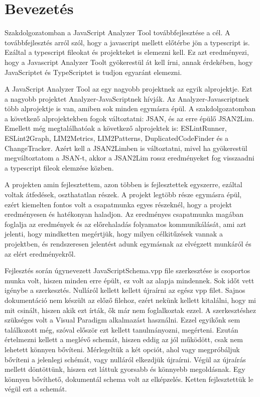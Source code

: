 \chapter*{Bevezetés}

\noindent

Szakdolgozatomban a JavaScript Analyzer Tool továbbfejlesztése a cél.
A továbbfejlesztés arról szól, hogy a javascript mellett előtérbe jön a typescript is.
Ezáltal a typescript fileokat és projekteket is elemezni kell.
Ez azt eredményezi, hogy a Javascript Analyzer Toolt gyökerestül át kell írni, annak érdekében,
hogy JavaScriptet és TypeScriptet is tudjon egyaránt elemezni.


\noindent

A JavaScript Analyzer Tool az egy nagyobb projektnek az egyik alprojektje. Ezt a nagyobb projektet Analyzer-JavaScriptnek hívják.
Az Analyzer-Javascriptnek több alprojektje is van, amiben sok minden egymásra épül.
A szakdolgozatomban a következő alprojektekben fogok változtatni: JSAN, és az erre épülő JSAN2Lim.
Emellett még megtalálhatóak a következő alprojektek is: ESLintRunner, ESLint2Graph, LIM2Metrics, LIM2Patterns, DuplicatedCodeFinder és a ChangeTracker.
Azért kell a JSAN2Limben is változtatni, mivel ha gyökerestül megváltoztatom a JSAN-t,
akkor a JSAN2Lim rossz eredményeket fog visszaadni a typescript fileok elemzése közben.


\noindent

A projekten amin fejlesztettem, azon többen is fejlesztettek egyszerre, ezáltal voltak átfedések, oszthatatlan részek.
A projekt legtöbb része egymásra épül, ezért kiemelten fontos volt a csapatmunka egyes részeknél, hogy a projekt eredményesen és hatékonyan haladjon.
Az eredményes csapatmunka magában foglalja az eredmények és az előrehaladás folyamatos kommunikálását,
ami azt jelenti, hogy mindketten megértjük, hogy milyen célkitűzések vannak a projektben,
és rendszeresen jelentést adunk egymásnak az elvégzett munkáról és az elért eredményekről.


\noindent

Fejlesztés során úgynevezett JavaScriptSchema.vpp file szerkesztése is csoportos munka volt, hiszen minden erre épült, ez volt az alapja mindennek.
Sok időt vett igénybe a szerkesztés. Nulláról kellett kellett újraírni az egész vpp filet.
Sajnos dokumentáció nem készült az előző filehoz, ezért nekünk kellett kitalálni, hogy mi mit csinált, hiszen akik ezt írták, ők már nem foglalkoztak ezzel.
A szerkesztéshez szükséges volt a Visual Paradigm alkalmazást használni.
Ezzel egyikőnk sem találkozott még, szóval először ezt kellett tanulmányozni, megérteni.
Ezután értelmezni kellett a meglévő schemát, hiszen eddig az jól működött, csak nem lehetett könnyen bővíteni.
Mérlegeltük a két opciót, ahol vagy megpróbáljuk bővíteni a jelenlegi schémát, vagy nulláról elkezdjük újraírni.
Végül az újraírás mellett döntöttünk, hiszen ezt láttuk gyorsabb és könnyebb megoldásnak. Egy könnyen bővíthető, dokumentál schema volt az elképzelés.
Ketten fejlesztettük le végül ezt a schemát.

